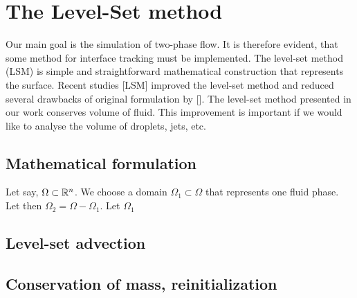 \chapter{The Level-Set method}

\par Our main goal is the simulation of two-phase flow. It is therefore evident, that some method for interface tracking must be implemented.
The level-set method (LSM) is simple and straightforward mathematical construction that represents the surface. Recent studies [LSM]
improved the level-set method and reduced several drawbacks of original formulation by []. The level-set method presented in our work
conserves volume of fluid. This improvement is important if we would like to analyse the volume of droplets, jets, etc.

\section{Mathematical formulation}

\par Let say, $\Omega \subset \mathbb{R}^n$. We choose a domain $\Omega_1 \subset \Omega$ that represents one fluid phase. Let then $\Omega_2 = \Omega - \Omega_1$.
Let $\Omega_1$ 

\section{Level-set advection}
\section{Conservation of mass, reinitialization}
